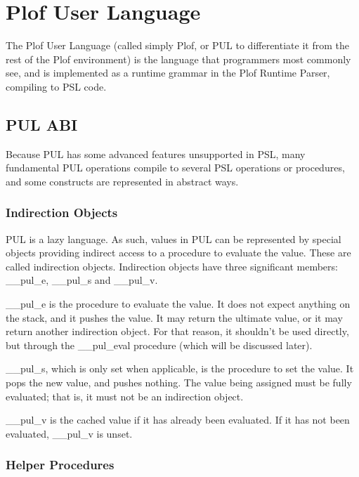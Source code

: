 \chapter{Plof User Language}

The Plof User Language (called simply Plof, or PUL to differentiate it from the rest of the Plof environment) is the language that programmers most commonly see, and is implemented as a runtime grammar in the Plof Runtime Parser, compiling to PSL code.



\section{PUL ABI}

Because PUL has some advanced features unsupported in PSL, many fundamental PUL operations compile to several PSL operations or procedures, and some constructs are represented in abstract ways.



\subsection{Indirection Objects}

PUL is a lazy language. As such, values in PUL can be represented by special objects providing indirect access to a procedure to evaluate the value. These are called indirection objects. Indirection objects have three significant members: \_\_pul\_e, \_\_pul\_s and \_\_pul\_v.

\_\_pul\_e is the procedure to evaluate the value. It does not expect anything on the stack, and it pushes the value. It may return the ultimate value, or it may return another indirection object. For that reason, it shouldn't be used directly, but through the \_\_pul\_eval procedure (which will be discussed later).

\_\_pul\_s, which is only set when applicable, is the procedure to set the value. It pops the new value, and pushes nothing. The value being assigned must be fully evaluated; that is, it must not be an indirection object.

\_\_pul\_v is the cached value if it has already been evaluated. If it has not been evaluated, \_\_pul\_v is unset.



\subsection{Helper Procedures}

